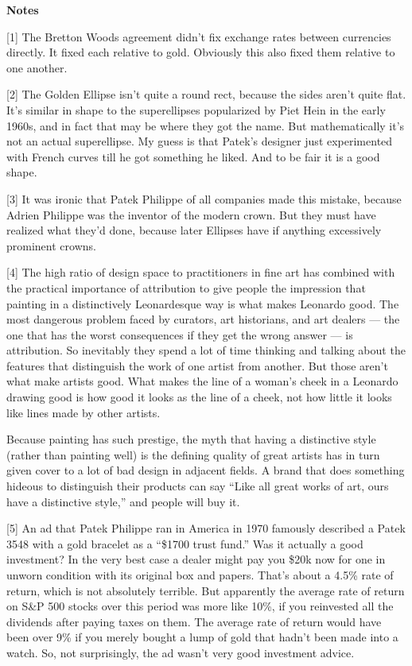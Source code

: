\textbf{Notes}

{[}1{]} The Bretton Woods agreement didn't fix exchange rates between
currencies directly. It fixed each relative to gold. Obviously this also
fixed them relative to one another.

{[}2{]} The Golden Ellipse isn't quite a round rect, because the sides
aren't quite flat. It's similar in shape to the superellipses
popularized by Piet Hein in the early 1960s, and in fact that may be
where they got the name. But mathematically it's not an actual
superellipse. My guess is that Patek's designer just experimented with
French curves till he got something he liked. And to be fair it is a
good shape.

{[}3{]} It was ironic that Patek Philippe of all companies made this
mistake, because Adrien Philippe was the inventor of the modern crown.
But they must have realized what they'd done, because later Ellipses
have if anything excessively prominent crowns.

{[}4{]} The high ratio of design space to practitioners in fine art has
combined with the practical importance of attribution to give people the
impression that painting in a distinctively Leonardesque way is what
makes Leonardo good. The most dangerous problem faced by curators, art
historians, and art dealers --- the one that has the worst consequences
if they get the wrong answer --- is attribution. So inevitably they
spend a lot of time thinking and talking about the features that
distinguish the work of one artist from another. But those aren't what
make artists good. What makes the line of a woman's cheek in a Leonardo
drawing good is how good it looks as the line of a cheek, not how little
it looks like lines made by other artists.

Because painting has such prestige, the myth that having a distinctive
style (rather than painting well) is the defining quality of great
artists has in turn given cover to a lot of bad design in adjacent
fields. A brand that does something hideous to distinguish their
products can say ``Like all great works of art, ours have a distinctive
style,'' and people will buy it.

{[}5{]} An ad that Patek Philippe ran in America in 1970 famously
described a Patek 3548 with a gold bracelet as a ``\$1700 trust fund.''
Was it actually a good investment? In the very best case a dealer might
pay you \$20k now for one in unworn condition with its original box and
papers. That's about a 4.5\% rate of return, which is not absolutely
terrible. But apparently the average rate of return on S\&P 500 stocks
over this period was more like 10\%, if you reinvested all the dividends
after paying taxes on them. The average rate of return would have been
over 9\% if you merely bought a lump of gold that hadn't been made into
a watch. So, not surprisingly, the ad wasn't very good investment
advice.


